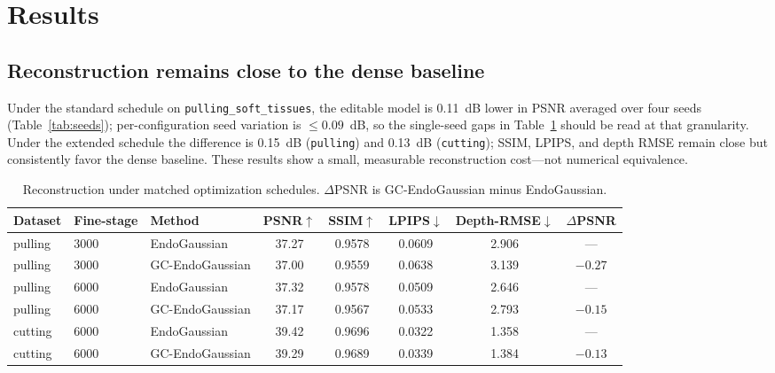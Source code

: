 \documentclass[AMA,Times1COL]{WileyNJDv5} %
\begin{document}
\section{Results}\label{sec5}

\subsection{Reconstruction remains close to the dense baseline}

Under the standard schedule on \texttt{pulling\_soft\_tissues}, the editable model is 0.11~dB lower in PSNR averaged over four seeds (Table~\ref{tab:seeds}); per-configuration seed variation is $\leq 0.09$~dB, so the single-seed gaps in Table~\ref{tab:recon} should be read at that granularity. Under the extended schedule the difference is 0.15~dB (\texttt{pulling}) and 0.13~dB (\texttt{cutting}); SSIM, LPIPS, and depth RMSE remain close but consistently favor the dense baseline. These results show a small, measurable reconstruction cost---not numerical equivalence.

\begin{table}[t]%
\centering
\caption{Reconstruction under matched optimization schedules. $\Delta$PSNR is GC-EndoGaussian minus EndoGaussian.\label{tab:recon}}%
\begin{tabular*}{\textwidth}{@{\extracolsep\fill}lllccccc@{\extracolsep\fill}}
\toprule
\textbf{Dataset} & \textbf{Fine-stage} & \textbf{Method} & \textbf{PSNR}$\uparrow$ & \textbf{SSIM}$\uparrow$ & \textbf{LPIPS}$\downarrow$ & \textbf{Depth-RMSE}$\downarrow$ & \textbf{$\Delta$PSNR} \\
\midrule
pulling & 3000 & EndoGaussian     & 37.27 & 0.9578 & 0.0609 & 2.906 & --- \\
pulling & 3000 & GC-EndoGaussian  & 37.00 & 0.9559 & 0.0638 & 3.139 & $-0.27$ \\
pulling & 6000 & EndoGaussian     & 37.32 & 0.9578 & 0.0509 & 2.646 & --- \\
pulling & 6000 & GC-EndoGaussian  & 37.17 & 0.9567 & 0.0533 & 2.793 & $-0.15$ \\
cutting & 6000 & EndoGaussian     & 39.42 & 0.9696 & 0.0322 & 1.358 & --- \\
cutting & 6000 & GC-EndoGaussian  & 39.29 & 0.9689 & 0.0339 & 1.384 & $-0.13$ \\
\bottomrule
\end{tabular*}
\end{table}
\end{document}
